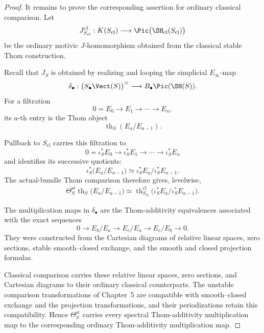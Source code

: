 \begin{proof}
It remains to prove the corresponding assertion for ordinary classical
comparison.  Let
\[
    J^{\mathrm{cl}}_{S_{\mathrm{cl}}}:
    K(S_{\mathrm{cl}})
    \longrightarrow
    \Pic
    \bigl(
      \SH_{\mathrm{cl}}(S_{\mathrm{cl}})
    \bigr)
\]
be the ordinary motivic \(J\)-homomorphism obtained from the classical
stable Thom construction.

Recall that \(J_S\) is obtained by realizing and looping the simplicial
\(E_\infty\)-map
\[
    \delta_\bullet:
    \bigl(
      S_\bullet\Vect(S)
    \bigr)^\simeq
    \longrightarrow
    B_\bullet\Pic(\SH(S)).
\]
For a filtration
\[
    0=E_0\longrightarrow E_1\longrightarrow\cdots\longrightarrow E_n,
\]
its \(a\)-th entry is the Thom object
\[
    \operatorname{th}_S(E_a/E_{a-1}).
\]

Pullback to \(S_{\mathrm{cl}}\) carries this filtration to
\[
    0=\iota_S^*E_0
    \longrightarrow
    \iota_S^*E_1
    \longrightarrow\cdots\longrightarrow
    \iota_S^*E_n
\]
and identifies its successive quotients:
\[
    \iota_S^*
    \bigl(
      E_a/E_{a-1}
    \bigr)
    \simeq
    \iota_S^*E_a/
    \iota_S^*E_{a-1}.
\]
The actual-bundle Thom comparison therefore gives, levelwise,
\[
\begin{aligned}
    \Theta_S^{\mathrm{st}}
    \operatorname{th}_S
    \bigl(
      E_a/E_{a-1}
    \bigr)
    \simeq
    \operatorname{th}^{\mathrm{cl}}_{S_{\mathrm{cl}}}
    \bigl(
      \iota_S^*E_a/
      \iota_S^*E_{a-1}
    \bigr).
\end{aligned}
\]

The multiplication maps in
\(\delta_\bullet\) are the Thom-additivity equivalences associated with the
exact sequences
\[
    0
    \longrightarrow
    E_b/E_a
    \longrightarrow
    E_c/E_a
    \longrightarrow
    E_c/E_b
    \longrightarrow
    0.
\]
They were constructed from the Cartesian diagrams of relative linear
spaces, zero sections, stable smooth--closed exchange, and the smooth and
closed projection formulas.

Classical comparison carries these relative linear spaces, zero sections,
and Cartesian diagrams to their ordinary classical counterparts.
The unstable comparison transformations of Chapter~5 are compatible with
smooth--closed exchange and the projection transformations, and their
periodizations retain this compatibility.  Hence
\(\Theta_S^{\mathrm{st}}\) carries every spectral Thom-additivity
multiplication map to the corresponding ordinary Thom-additivity
multiplication map.


\end{proof}
